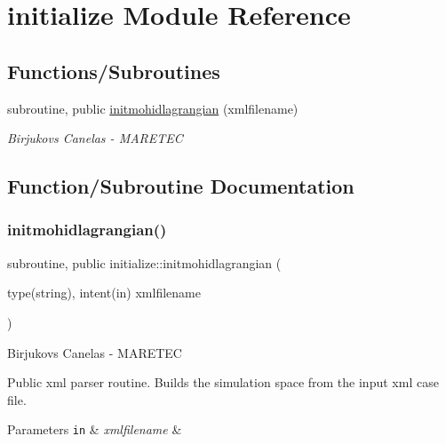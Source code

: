 \hypertarget{namespaceinitialize}{}\section{initialize Module Reference}
\label{namespaceinitialize}
\subsection*{Functions/\+Subroutines}
\begin{DoxyCompactItemize}
\item 
subroutine, public \mbox{\hyperlink{namespaceinitialize_a45b7ca20c45cf272acbc391950cbb804}{initmohidlagrangian}} (xmlfilename)
\begin{DoxyCompactList}\small\item\em Birjukovs Canelas -\/ M\+A\+R\+E\+T\+EC \end{DoxyCompactList}\end{DoxyCompactItemize}


\subsection{Function/\+Subroutine Documentation}
\mbox{\label{namespaceinitialize_a45b7ca20c45cf272acbc391950cbb804}} 
\subsubsection{\texorpdfstring{initmohidlagrangian()}{initmohidlagrangian()}}
{\footnotesize\ttfamily subroutine, public initialize\+::initmohidlagrangian (\begin{DoxyParamCaption}\item[{type(string), intent(in)}]{xmlfilename }\end{DoxyParamCaption})}



Birjukovs Canelas -\/ M\+A\+R\+E\+T\+EC 

Public xml parser routine. Builds the simulation space from the input xml case file. 
\begin{DoxyParams}[1]{Parameters}
\mbox{\tt in}  & {\em xmlfilename} & \\
\hline
\end{DoxyParams}
